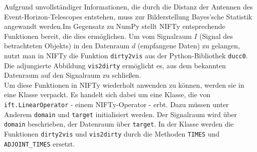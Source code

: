 \documentclass[]{dsadokumentation}
\begin{document}
Aufgrund unvollständiger Informationen, die durch die Distanz der Antennen des Event-Horizon-Telescopes entstehen, muss zur Bilderstellung Bayes'sche Statistik angewandt werden.Im Gegensatz zu NumPy stellt NIFTy entsprechende Funktionen bereit, die dies ermöglichen. Um vom Signalraum $I$ (Signal des betrachteten Objekts) in den Datenraum $d$ (empfangene Daten) zu gelangen, nutzt man in NIFTy die Funktion \verb|dirty2vis| aus der Python-Bibliothek \verb|ducc0|. Die adjungierte Abbildung \verb|vis2dirty| ermöglicht es, aus dem bekannten Datenraum auf den Signalraum zu schließen.\\
Um diese Funktionen in NIFTy wiederholt anwenden zu können, werden sie in eine Klasse verpackt. Es handelt sich dabei um eine Klasse, die von \verb|ift.LinearOperator| - einem NIFTy-Operator - erbt. Dazu müssen unter Anderem \verb|domain| und \verb|target| initialisiert werden. Der Signalraum wird über \verb|domain| beschrieben, der Datenraum über \verb|target|. In der Klasse werden die Funktionen \verb|dirty2vis| und \verb|vis2dirty| durch die Methoden \verb|TIMES| und \verb|ADJOINT_TIMES| ersetzt.
\end{document}
